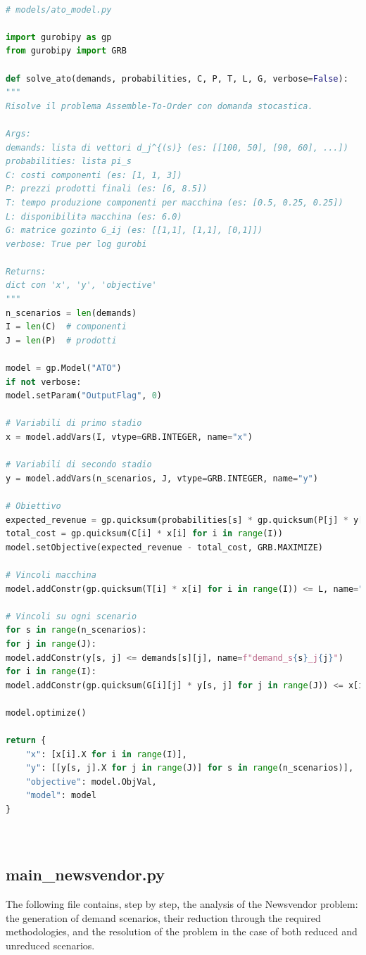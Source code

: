 \documentclass[a4paper,12pt]{article}
\begin{document}
\begin{lstlisting}[language=python,caption={Definition of the function to solve ATO model},label={lst:ATO-model}]

# models/ato_model.py

import gurobipy as gp
from gurobipy import GRB

def solve_ato(demands, probabilities, C, P, T, L, G, verbose=False):
"""
Risolve il problema Assemble-To-Order con domanda stocastica.

Args:
demands: lista di vettori d_j^{(s)} (es: [[100, 50], [90, 60], ...])
probabilities: lista pi_s
C: costi componenti (es: [1, 1, 3])
P: prezzi prodotti finali (es: [6, 8.5])
T: tempo produzione componenti per macchina (es: [0.5, 0.25, 0.25])
L: disponibilita macchina (es: 6.0)
G: matrice gozinto G_ij (es: [[1,1], [1,1], [0,1]])
verbose: True per log gurobi

Returns:
dict con 'x', 'y', 'objective'
"""
n_scenarios = len(demands)
I = len(C)  # componenti
J = len(P)  # prodotti

model = gp.Model("ATO")
if not verbose:
model.setParam("OutputFlag", 0)

# Variabili di primo stadio
x = model.addVars(I, vtype=GRB.INTEGER, name="x")

# Variabili di secondo stadio
y = model.addVars(n_scenarios, J, vtype=GRB.INTEGER, name="y")

# Obiettivo
expected_revenue = gp.quicksum(probabilities[s] * gp.quicksum(P[j] * y[s, j] for j in range(J)) for s in range(n_scenarios))
total_cost = gp.quicksum(C[i] * x[i] for i in range(I))
model.setObjective(expected_revenue - total_cost, GRB.MAXIMIZE)

# Vincoli macchina
model.addConstr(gp.quicksum(T[i] * x[i] for i in range(I)) <= L, name="capacity")

# Vincoli su ogni scenario
for s in range(n_scenarios):
for j in range(J):
model.addConstr(y[s, j] <= demands[s][j], name=f"demand_s{s}_j{j}")
for i in range(I):
model.addConstr(gp.quicksum(G[i][j] * y[s, j] for j in range(J)) <= x[i], name=f"gozinto_s{s}_i{i}")

model.optimize()

return {
	"x": [x[i].X for i in range(I)],
	"y": [[y[s, j].X for j in range(J)] for s in range(n_scenarios)],
	"objective": model.ObjVal,
	"model": model
}
	
	
\end{lstlisting}

\subsection{main\_newsvendor.py}
The following file contains, step by step, the analysis of the Newsvendor problem: the generation of demand scenarios, their reduction through the required methodologies, and the resolution of the problem in the case of both reduced and unreduced scenarios.
\end{document}

